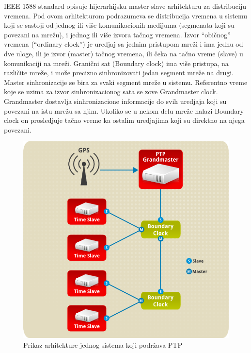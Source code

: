 \documentclass[a4paper,12pt, master]{etf}
\begin{document}
	IEEE 1588 standard opisuje hijerarhijsku master-slave arhitekturu za
	distribuciju vremena. Pod ovom arhitekturom podrazumeva se distribucija
	vremena u sistemu koji se sastoji od jednog ili vi\v{s}e komunikacionih
	medijuma (segmenata koji su povezani na mre\v{z}u), i jednog ili vi\v{s}e
	izvora ta\v{c}nog vremena. Izvor ``obi\v{c}nog'' vremena (``ordinary
    clock'') je uredjaj sa jednim pristupom mre\v{z}i i ima jednu od dve uloge,
    ili je izvor (master) ta\v{c}nog vremena, ili \v{c}eka na ta\v{c}no vreme
    (slave) u komunikaciji na mre\v{z}i. Grani\v{c}ni sat (Boundary clock) ima
    vi\v{s}e pristupa, na razli\v{c}ite mre\v{z}e, i mo\v{z}e precizno
    sinhronizovati jedan segment mre\v{z}e na drugi. Master sinhronizacije se
    bira za svaki segment mre\v{z}e u sistemu. Referentno vreme koje se uzima za
	izvor sinhronizacionog sata se zove Grandmaster clock. Grandmaster
	dostavlja sinhronizacione informacije do svih uredjaja koji su povezani na
	istu mre\v{z}u sa njim. Ukoliko se u nekom delu mre\v{z}e nalazi Boundary
	clock on prosledjuje ta\v{c}no vreme ka ostalim uredjajima koji su direktno
	na njega povezani.

	\begin{figure}[htb]
			\centering
			\includegraphics[scale=.3]{../pic/arch_ptp_system.png}
            \caption{Prikaz arhitekture jednog sistema koji podr\v{z}ava PTP}
			\label{fig:arch_ptp_system}
	\end{figure}
\end{document}
